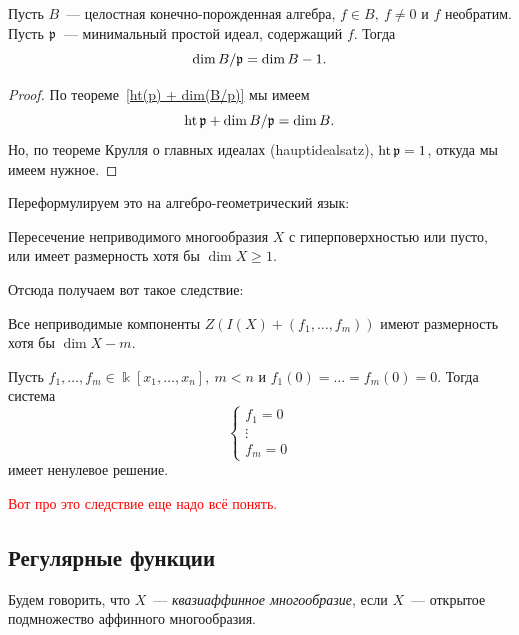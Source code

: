 	\begin{corollary}
		Пусть $B$~--- целостная конечно-порожденная алгебра, $f \in B, \ f \neq 0$ и $f$ необратим. Пусть $\mathfrak{p}$~--- минимальный простой идеал, содержащий $f$. Тогда 
		\[
			\dim{B/\mathfrak{p}} = \dim{B} - 1.
		\]
	\end{corollary}
	\begin{proof}
		По теореме~\ref{ht(p) + dim(B/p)} мы имеем 
		\[
			\operatorname{ht}{\mathfrak{p}} + \dim{B/\mathfrak{p}} = \dim{B}.
		\]
		Но, по теореме Крулля о главных идеалах (hauptidealsatz), $\operatorname{ht}{\mathfrak{p}} = 1$, откуда мы имеем нужное.  
	\end{proof}

	Переформулируем это на алгебро-геометрический язык: 

	\begin{corollary}
		Пересечение неприводимого многообразия $X$ с гиперповерхностью или пусто, или имеет размерность хотя бы $\dim{X} \ge 1$. 
	\end{corollary}

	Отсюда получаем вот такое следствие: 
	

	\begin{statement}\label{dim{X} - m} 
		Все неприводимые компоненты $Z(I(X) + (f_1, \ldots, f_m))$ имеют размерность хотя бы $\dim{X} - m$.		
	\end{statement}
	
	\begin{corollary}\hypertarget{bilet_16}{}
		Пусть $f_1, \ldots, f_m \in \Bbbk[x_1, \ldots, x_n], \ m < n$ и $f_1(0) = \ldots = f_m(0) = 0$. Тогда система 
		\[
			\begin{cases} 
			f_1 = 0 \\ 
			\vdots \\
			f_m = 0
			\end{cases}
		\]
		имеет ненулевое решение. 
	\end{corollary}
	\textcolor{red}{Вот про это следствие еще надо всё понять.}

	

	\subsection{Регулярные функции}

	\begin{definition} 
		Будем говорить, что $X$~--- \emph{квазиаффинное многообразие}, если $X$~--- открытое подмножество аффинного многообразия. 
	\end{definition}

	\hypertarget{bilet_4}{}


